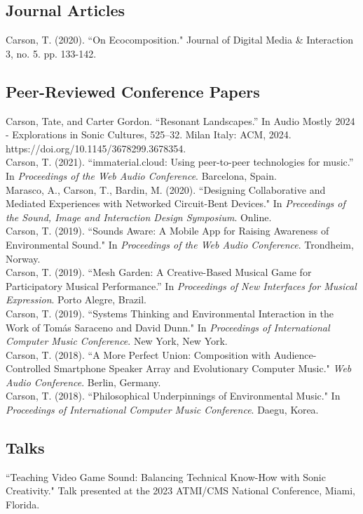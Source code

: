 \documentclass[10pt, a4paper]{article}
\newcommand{\years}[1]{\marginnote{\scriptsize #1}}
\begin{document}
\subsection*{Journal Articles}
\noindent
\years{2020}Carson, T. (2020). ``On Ecocomposition." Journal of Digital Media \& Interaction 3, no. 5. pp. 133-142.

\subsection*{Peer-Reviewed Conference Papers}
\years{2024} Carson, Tate, and Carter Gordon. “Resonant Landscapes.” In Audio Mostly 2024 - Explorations in Sonic Cultures, 525–32. Milan Italy: ACM, 2024. https://doi.org/10.1145/3678299.3678354.\\
\years{2021} Carson, T. (2021). ``immaterial.cloud: Using peer-to-peer technologies for music.'' In \textit{Proceedings of the Web Audio Conference}. Barcelona, Spain.\\ 
\years{2020} Marasco, A., Carson, T., Bardin, M. (2020). ``Designing Collaborative and Mediated Experiences with Networked Circuit-Bent Devices." In \textit{Preceedings of the Sound, Image and Interaction Design Symposium}. Online.\\
\years{2019} Carson, T. (2019). “Sounds Aware: A Mobile App for Raising Awareness of Environmental Sound." In \textit{Proceedings of the Web Audio Conference}. Trondheim, Norway.\\
 Carson, T. (2019). “Mesh Garden: A Creative-Based Musical Game for Participatory Musical Performance.” In \textit{Proceedings of New Interfaces for Musical Expression}. Porto Alegre, Brazil.\\
Carson, T. (2019). ``Systems Thinking and Environmental Interaction in the Work of Tomás Saraceno and David Dunn." In \textit{Proceedings of International Computer Music Conference}. New York, New York.\\
\years{2018} Carson, T. (2018). “A More Perfect Union: Composition with Audience-Controlled Smartphone Speaker Array and Evolutionary Computer Music." \textit{Web Audio Conference}. Berlin, Germany.\\
 Carson, T. (2018). “Philosophical Underpinnings of Environmental Music." In \textit{Proceedings of International Computer Music Conference}. Daegu, Korea.

\subsection*{Talks}
\years{2023} ``Teaching Video Game Sound: Balancing Technical Know-How with Sonic Creativity." Talk presented at the 2023 ATMI/CMS National Conference, Miami, Florida.
\end{document}
